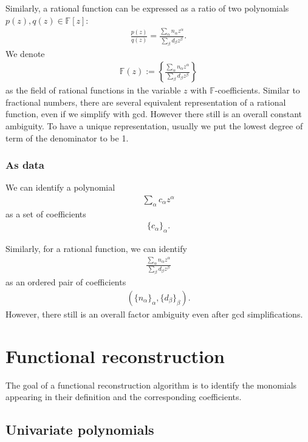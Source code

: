 \documentclass[11pt]{book}
\begin{document}
Similarly, a rational function can be expressed as a ratio of two polynomials $p(z),q(z) \in \mathbb{F}[z]$:
\begin{eqnarray}
\frac{p(z)}{q(z)} = \frac{\sum_\alpha n_\alpha z^\alpha}{\sum_\beta d_\beta z^\beta}.
\end{eqnarray}
We denote
\begin{eqnarray}
\mathbb{F}(z) := \left\{ \frac{\sum_\alpha n_\alpha z^\alpha}{\sum_\beta d_\beta z^\beta} \right\}
\end{eqnarray}
as the field of rational functions in the variable $z$ with $\mathbb{F}$-coefficients.
Similar to fractional numbers, there are several equivalent representation of a rational function, even if we simplify with gcd.
However there still is an overall constant ambiguity.
To have a unique representation, usually we put the lowest degree of term of the denominator to be 1.

\subsection{As data}
We can identify a polynomial
\begin{eqnarray}
\sum_\alpha c_\alpha z^\alpha
\end{eqnarray}
as a set of coefficients
\begin{eqnarray}
\{ c_\alpha\}_{\alpha}.
\end{eqnarray}

Similarly, for a rational function, we can identify
\begin{eqnarray}
\frac{\sum_\alpha n_\alpha z^\alpha}{\sum_\beta d_\beta z^\beta}
\end{eqnarray}
as an ordered pair of coefficients
\begin{eqnarray}
(\{ n_\alpha\}_\alpha, \{ d_\beta\}_\beta).
\end{eqnarray}
However, there still is an overall factor ambiguity even after gcd simplifications.

\chapter{Functional reconstruction}
The goal of a functional reconstruction algorithm is to identify the monomials appearing in their definition and the corresponding coefficients.

\section{Univariate polynomials}
\end{document}
